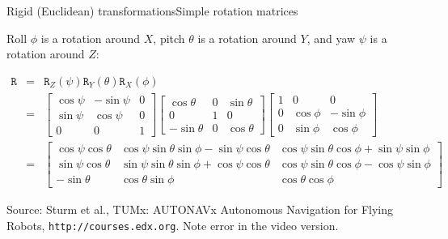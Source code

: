 \documentclass[aspectratio=169]{beamer}
\newcommand{\mat}[1]{\mathtt{#1}}
\begin{document}
\begin{frame}{Rigid (Euclidean) transformations}{Simple rotation matrices}

Roll $\phi$ is a rotation around $X$,
pitch $\theta$ is a rotation around $Y$, and
yaw $\psi$ is a rotation around $Z$:

\begin{scriptsize}
\begin{eqnarray*}
\mat{R} & = & \mat{R}_Z(\psi) \mat{R}_Y(\theta) \mat{R}_X(\phi) \\
& = &
\begin{bmatrix}
\cos \psi & -\sin \psi & 0 \\
\sin \psi &  \cos \psi & 0 \\
0 & 0 & 1
\end{bmatrix}
\begin{bmatrix}
 \cos \theta & 0 & \sin \theta \\
 0 & 1 & 0 \\
-\sin \theta & 0 & \cos \theta
\end{bmatrix}
\begin{bmatrix}
1 & 0 & 0 \\
0 & \cos \phi & -\sin \phi \\
0 & \sin \phi &  \cos \phi
\end{bmatrix} \\
& = & \begin{bmatrix}
\cos\psi \cos\theta & \cos\psi\sin\theta\sin\phi - \sin\psi\cos\theta &
\cos\psi \sin\theta \cos\phi + \sin\psi\sin\phi \\
\sin\psi \cos\theta & \sin\psi\sin\theta\sin\phi + \cos\psi\cos\theta &
\cos\psi \sin\theta \cos\phi - \cos\psi\sin\phi \\
-\sin\theta & \cos\theta \sin\phi & \cos\theta \cos\phi
\end{bmatrix}
\end{eqnarray*}

\begin{minipage}{4in}
Source: Sturm et al., TUMx: AUTONAVx Autonomous Navigation for
Flying Robots, \texttt{http://courses.edx.org}. Note error in
the video version.
\end{minipage}

\end{scriptsize}

\end{frame}
\end{document}
